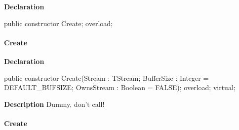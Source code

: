 \documentclass{report}
\newif\ifpdf
\begin{document}
\label{PasDoc_StreamUtils.TBufferedStream-Create}
\begin{list}{}{
\setlength{\itemindent}{0cm}
\setlength{\listparindent}{0cm}
\setlength{\leftmargin}{\evensidemargin}
\addtolength{\leftmargin}{\tmplength}
\settowidth{\labelsep}{X}
\addtolength{\leftmargin}{\labelsep}
\setlength{\labelwidth}{\tmplength}
}
\item[\textbf{Declaration}\hfill]
\ifpdf
\begin{flushleft}
\fi
\begin{ttfamily}
public constructor Create; overload;\end{ttfamily}

\ifpdf
\end{flushleft}
\fi

\end{list}
\paragraph*{Create}\hspace*{\fill}

\label{PasDoc_StreamUtils.TBufferedStream-Create}
\begin{list}{}{
\setlength{\itemindent}{0cm}
\setlength{\listparindent}{0cm}
\setlength{\leftmargin}{\evensidemargin}
\addtolength{\leftmargin}{\tmplength}
\settowidth{\labelsep}{X}
\addtolength{\leftmargin}{\labelsep}
\setlength{\labelwidth}{\tmplength}
}
\item[\textbf{Declaration}\hfill]
\ifpdf
\begin{flushleft}
\fi
\begin{ttfamily}
public constructor Create(Stream : TStream; BufferSize : Integer = DEFAULT{\_}BUFSIZE; OwnsStream : Boolean = FALSE); overload; virtual;\end{ttfamily}

\ifpdf
\end{flushleft}
\fi

\par
\item[\textbf{Description}]
Dummy, don't call!

\end{list}
\paragraph*{Create}\hspace*{\fill}
\end{document}
